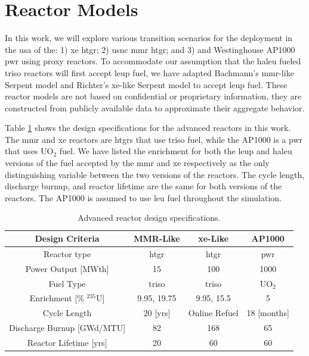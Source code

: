 \section{Reactor Models}
\label{sec:reactor_models}

In this work, we will explore various transition scenarios for the deployment in the \gls{usa} of the: 1) \gls{xe} \gls{htgr}; 2) \gls{usnc} \gls{mmr} \gls{htgr}; and 3) and Westinghouse AP1000 \gls{pwr} using proxy reactors. To accommodate our assumption that the \gls{haleu} fueled \gls{triso} reactors will first accept \gls{leup} fuel, we have adapted Bachmann's \gls{mmr}-like Serpent model \cite{bachmann_mmr_like_2023} and Richter's \gls{xe}-like Serpent model \cite{richter_xe100_like} to accept \gls{leup} fuel. These reactor models are not based on confidential or proprietary information, they are constructed from publicly available data to approximate their aggregate behavior.

Table \ref{tab:ar_defs} shows the design specifications for the advanced reactors in this work. The \gls{mmr} and \gls{xe} reactors are \gls{htgr}s that use \gls{triso} fuel, while the AP1000 is a \gls{pwr} that uses UO$_2$ fuel. We have listed the enrichment for both the \gls{leup} and \gls{haleu} versions of the fuel accepted by the \gls{mmr} and \gls{xe} respectively as the only distinguishing variable between the two versions of the reactors. The cycle length, discharge burnup, and reactor lifetime are the same for both versions of the reactors. The AP1000 is assumed to use \gls{leu} fuel throughout the simulation.

\begin{table}[H]
   \centering
   \caption{Advanced reactor design specifications.}
   \label{tab:ar_defs}
   \begin{tabular}{c c c c}
      \hline
      \textbf{Design Criteria} & \textbf{MMR-Like} \cite{usnc_design_2021} & \textbf{\gls{xe}-Like} \cite{nuscale_chapter_2018} & \textbf{AP1000} \\
      \hline
      Reactor type & \gls{htgr} & \gls{htgr} & \gls{pwr} \\
      Power Output [MWth] & 15 & 100 & 1000 \\
      Fuel Type & \gls{triso} & \gls{triso} & UO$_2$ \\
      Enrichment [\% $^{235}$U] & 9.95, 19.75 & 9.95, 15.5 & 5 \\
      Cycle Length & 20 [yrs] & Online Refuel & 18 [months] \\
      Discharge Burnup [GWd/MTU] & 82 & 168 & 65 \\
      Reactor Lifetime [yrs] & 20 & 60 & 60 \\
      \hline
   \end{tabular}
\end{table}

